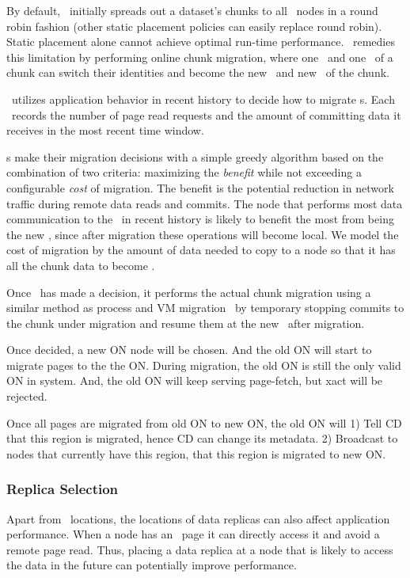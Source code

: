 By default, \hotpot\ initially spreads out a dataset's chunks to all \hotpot\ nodes in a round robin fashion
(other static placement policies can easily replace round robin).
Static placement alone cannot achieve optimal run-time performance.
\hotpot\ remedies this limitation by performing online chunk migration,
where one \on\ and one \dn\ of a chunk can switch their identities
and become the new \dn\ and new \on\ of the chunk.

\hotpot\ utilizes application behavior in recent history 
to decide how to migrate \on{}s.
Each \on\ records the number of page read requests
and the amount of committing data it receives in the most recent time window.

\on{}s make their migration decisions with a simple greedy algorithm based on the combination of two criteria:
maximizing the {\em benefit} while not exceeding a configurable {\em cost} of migration.
The benefit is the potential reduction in network traffic during remote data reads and commits.
The node that performs most data communication to the \on\ in recent history
is likely to benefit the most from being the new \on,
since after migration these operations will become local.
We model the cost of migration by the amount of data needed to copy to a node so that it has all the chunk data to become \on.

Once \hotpot\ has made a decision, it performs the actual chunk migration using 
a similar method as process and VM migration~\cite{OsmanEtAl02-Zap,Douglis87-Migration,Clark05-XenMigrate}
by temporary stopping commits to the chunk under migration
and resume them at the new \on\ after migration.

    Once decided, a new ON node will be chosen. And the old ON will start to migrate pages to the
    the ON. During migration, the old ON is still the only valid ON in system. And, the old ON
    will keep serving page-fetch, but xact will be rejected.

    Once all pages are migrated from old ON to new ON, the old ON will 1) Tell CD that this region
    is migrated, hence CD can change its metadata. 2) Broadcast to nodes that currently have this
    region, that this region is migrated to new ON.
\fi

\subsubsection{Replica Selection}
Apart from \on\ locations, the locations of data replicas can also affect application performance.
When a node has an \redundant\ page it can directly access it and avoid a remote page read. 
Thus, placing a data replica at a node that is likely to access the data in the future
can potentially improve performance.

